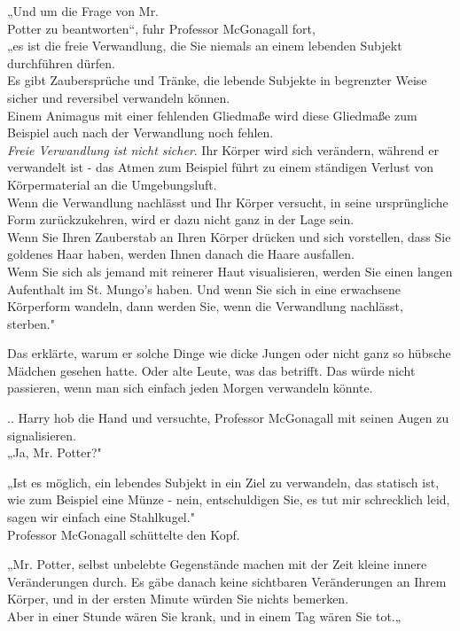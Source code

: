 {„Und um die Frage von Mr.\\ Potter zu beantworten“, fuhr Professor McGonagall fort,\\ „es ist die freie Verwandlung, die Sie niemals an einem lebenden Subjekt durchführen dürfen.\\ Es gibt Zaubersprüche und Tränke, die lebende Subjekte in begrenzter Weise sicher und reversibel verwandeln können.\\ Einem Animagus mit einer fehlenden Gliedmaße wird diese Gliedmaße zum Beispiel auch nach der Verwandlung noch fehlen.\\ \emph{Freie Verwandlung ist nicht sicher}. Ihr Körper wird sich verändern, während er verwandelt ist - das Atmen zum Beispiel führt zu einem ständigen Verlust von Körpermaterial an die Umgebungsluft.\\ Wenn die Verwandlung nachlässt und Ihr Körper versucht, in seine ursprüngliche Form zurückzukehren, wird er dazu nicht ganz in der Lage sein.\\ Wenn Sie Ihren Zauberstab an Ihren Körper drücken und sich vorstellen, dass Sie goldenes Haar haben, werden Ihnen danach die Haare ausfallen.\\ Wenn Sie sich als jemand mit reinerer Haut visualisieren, werden Sie einen langen Aufenthalt im St. Mungo's haben. Und wenn Sie sich in eine erwachsene Körperform wandeln, dann werden Sie, wenn die Verwandlung nachlässt, sterben."

Das erklärte, warum er solche Dinge wie dicke Jungen oder nicht ganz so hübsche Mädchen gesehen hatte. Oder alte Leute, was das betrifft. Das würde nicht passieren, wenn man sich einfach jeden Morgen verwandeln könnte.

.. Harry hob die Hand und versuchte, Professor McGonagall mit seinen Augen zu signalisieren.\\ „Ja, Mr. Potter?"

„Ist es möglich, ein lebendes Subjekt in ein Ziel zu verwandeln, das statisch ist, wie zum Beispiel eine Münze - nein, entschuldigen Sie, es tut mir schrecklich leid, sagen wir einfach eine Stahlkugel."\\ Professor McGonagall schüttelte den Kopf.

„Mr. Potter, selbst unbelebte Gegenstände machen mit der Zeit kleine innere Veränderungen durch. Es gäbe danach keine sichtbaren Veränderungen an Ihrem Körper, und in der ersten Minute würden Sie nichts bemerken.\\ Aber in einer Stunde wären Sie krank, und in einem Tag wären Sie tot.„

}
